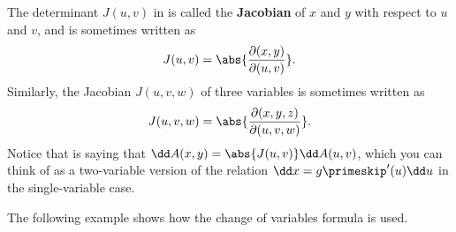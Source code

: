 
The determinant $J(u,v)$ in  is called the \textbf{Jacobian} of $x$ and $y$ with respect to $u$ and $v$, and is sometimes written as
\[J(u,v) = \abs{\frac{\partial (x,y)}{\partial (u,v)}} .\]
Similarly, the Jacobian $J(u,v,w)$ of three variables is sometimes written as
\[J(u,v,w) = \abs{\frac{\partial (x,y,z)}{\partial (u,v,w)}} .\]
Notice that  is saying that $\dd A(x,y) = \abs{J(u,v)}\dd A(u,v)$, which you can think of as a two-variable version of the relation $\dd x = g\primeskip'(u)\dd u$ in the single-variable case.


The following example shows how the change of variables formula is used.

